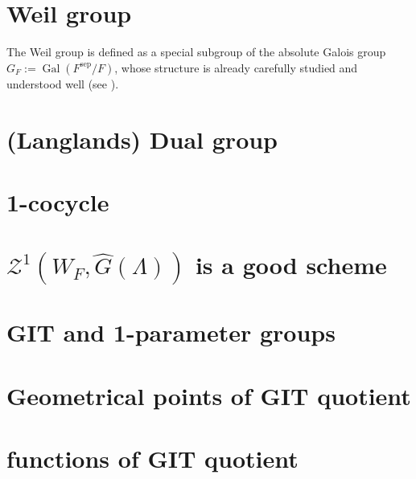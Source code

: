 \documentclass[reqno,11pt]{amsart}
\numberwithin{equation}{section}
\theoremstyle{plain}
\theoremstyle{plain}
\numberwithin{equation}{section}
\theoremstyle{remark}
\newcommand{\Gal}{\operatorname{Gal}}
\newcommand{\sep}{\operatorname{sep}}
\begin{document}
\section{Weil group}
The Weil group is defined as a special subgroup of the absolute Galois group $G_F:=\Gal(F^{\sep}/F)$, whose structure is already carefully studied and understood well (see \cite{Alex????galois}).

\section{(Langlands) Dual group}
\section{1-cocycle}
\section{$\mathcal{Z}^1(W_F,\hat{G}(\Lambda))$ is a good scheme}
\section{GIT and 1-parameter groups}
\section{Geometrical points of GIT quotient}
\section{functions of GIT quotient}



\end{document}
